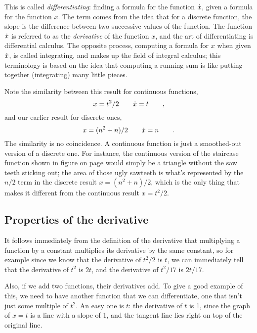 This is called \emph{differentiating}: finding a formula for the function $\dot{x}$, given a formula
for the function $x$. The term comes from the idea that for a discrete function, the slope is
the difference between two successive values of the function. The function $\dot{x}$ is referred to as
the \emph{derivative} of the function $x$, and the art of differentiating is differential
calculus.
The opposite process, computing a formula for $x$ when given $\dot{x}$,  is called integrating,
and makes up the field of integral calculus;
this terminology is based on the idea that computing
a running sum is like putting together (integrating) many little pieces.

Note the similarity between this result for continuous functions,
\begin{equation*}
  x=t^2/2 \qquad \dot{x}=t \qquad ,
\end{equation*}
and our earlier result for discrete ones,
\begin{equation*}
  x=(n^2+n)/2 \qquad \dot{x}=n \qquad .
\end{equation*}
The similarity is no coincidence. A continuous function is just a smoothed-out version of
a discrete one. For instance, the continuous version of the staircase function shown in figure
 on page \pageref{fig:gauss-solution} would simply be a triangle
without the saw teeth sticking out; the area of those ugly sawteeth is what's represented
by the $n/2$ term in the discrete result $x=(n^2+n)/2$, which is the only thing that makes
it different from the continuous result $x=t^2/2$.

\subsection{Properties of the derivative}

It follows immediately from the definition of the derivative that multiplying a function by
a constant multiplies its derivative by the same constant, so for example since we know
that the derivative of $t^2/2$ is $t$, we can immediately tell that the derivative of
$t^2$ is $2t$, and the derivative of $t^2/17$ is $2t/17$.

Also, if we add two functions, their derivatives add. To give a good example of this, we
need to have another function that we can differentiate, one that isn't just some multiple
of $t^2$. An easy one is $t$: the derivative of $t$ is 1, since the graph
of $x=t$ is a line with a slope of 1, and the tangent line lies right on top of the
original line.

